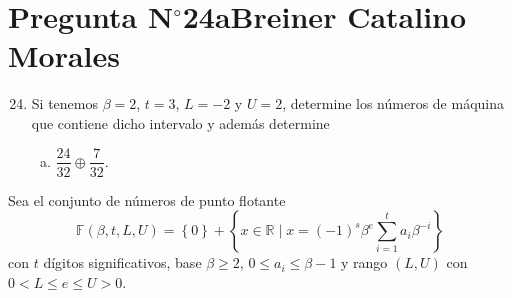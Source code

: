 \section{Pregunta N$^{\circ}$24a\qquad Breiner Catalino Morales}

\begin{frame}
	\begin{enumerate}\setcounter{enumi}{23}
		\item

		      Si tenemos $\beta=2$, $t=3$, $L=-2$ y $U=2$, determine los
		      números de máquina que contiene dicho intervalo y además
		      determine

		      \begin{enumerate}[b)]
			      \item

			            \begin{math}
				            \dfrac{24}{32}\oplus
				            \dfrac{7}{32}
			            \end{math}.
		      \end{enumerate}
	\end{enumerate}

	\begin{solution}
		\begin{definition}
			Sea el \alert{conjunto de números de punto flotante}
			\begin{equation*}
				\mathbb{F}\left(\beta,t,L,U\right)=
				\left\{0\right\}+
				\left\{
				x\in\mathbb{R}\mid
				x=
				\left(-1\right)^{s}
				\beta^{e}
				\sum_{i=1}^{t}a_{i}\beta^{-i}
				\right\}
			\end{equation*}
			con $t$ dígitos significativos, base $\beta\geq2$,
			$0\leq a_{i}\leq\beta-1$ y rango $\left(L,U\right)$ con
			$0<L\leq e\leq U>0$.
		\end{definition}
	\end{solution}
\end{frame}

